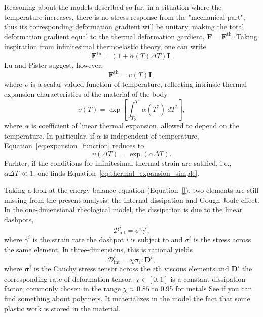 Reasoning about the models described so far, in a situation where the temperature increases, there is no stress response from the "mechanical part", thus its corresponding deformation gradient will be unitary, making the total deformation gradient equal to the thermal deformation gardient, $\mathbf F = \mathbf F^\text{th}$.
Taking inspiration from infinitesimal thermoelastic theory, one can write
\begin{equation}
	\label{eq:thermal_expansion_simple}
	\mathbf F^\text{th} = (1 + \alpha(T)\Delta T)\mathbf I.
\end{equation}
Lu and Pister \citep{luDecompositionDeformationRepresentation1975} suggest, however,
\begin{equation}
	\mathbf F^\text{th} = \upsilon(T)\mathbf I,
\end{equation}
where $\upsilon$ is a scalar-valued function of temperature, reflecting intrinsic thermal expansion characteristics of the material of the body
\begin{equation}
	\label{eq:expansion_function}
	\upsilon(T) = \exp\left[\int_{T_0}^T \alpha(T^*)\ dT^*\right],
\end{equation}
where $\alpha$ is coefficient of linear thermal expansion, allowed to depend on the temperature.
In particular, if $\alpha$ is independent of temperature, Equation~\ref{eq:expansion_function} reduces to
\begin{equation}
	\upsilon(\Delta T) = \exp(\alpha \Delta T).
\end{equation}
Furhter, if the conditions for infinitesimal thermal strain are satified, i.e., $\alpha\Delta T \ll 1$, one finds Equation~\eqref{eq:thermal_expansion_simple}.

Taking a look at the energy balance equation (Equation~\eqref{}), two elements are still missing from the present analysis: the internal dissipation and Gough-Joule effect.
In the one-dimensional rheological model, the dissipation is due to the linear dashpots,
\begin{equation}
	\mathcal D^i_\text{int} = \sigma^i {\dot\gamma}^i,
\end{equation}
where ${\dot \gamma}^i$ is the strain rate the dashpot $i$ is subject to and $\sigma^i$ is the stress across the same element.
In three-dimensions, this is rational yields
\begin{equation}
	\mathcal D_\text{int}^i = \chi\mathbf \sigma_i : \mathbf D^i,
\end{equation}
where $\bm \sigma^i$ is the Cauchy stress tensor across the $i$th viscous elements and $\mathbf D^i$ the corresponding rate of deformation tensor.
$\chi\in [0, 1]$ is a constant dissipation factor, commonly chosen in the range $\chi\approx 0.85$ to 0.95 for metals \citep{simoAssociativeCoupledThermoplasticity1992} \colorbox{BurntOrange}{See if you can find something about polymers}.
It materializes in the model the fact that some plastic work is stored in the material.

